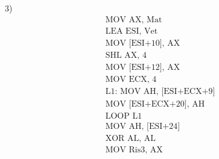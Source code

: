 \documentclass[a4paper, 12pt]{article} %
\begin{document}
\textsf{\large{\color{red} 3) }} \\

\begin{align*}
	&\text{MOV AX, Mat} \\
	&\text{LEA ESI, Vet} \\
	&\text{MOV [ESI+10], AX} \\
	&\text{SHL AX, 4} \\
	&\text{MOV [ESI+12], AX} \\
	&\text{MOV ECX, 4} \\
	&\text{L1: MOV AH, [ESI+ECX+9]} \\
	&\text{MOV [ESI+ECX+20], AH} \\
	&\text{LOOP L1} \\
	&\text{MOV AH, [ESI+24]} \\
	&\text{XOR AL, AL} \\
	&\text{MOV Ris3, AX} \\
\end{align*}
\end{document}
